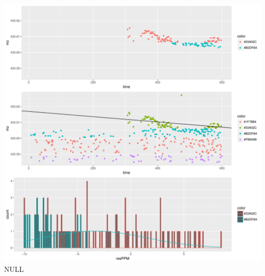\documentclass[]{article}
\begin{document}
\includegraphics{Supplementary_document_files/figure-latex/filter.lm.430-1.pdf}
NULL
\end{document}
